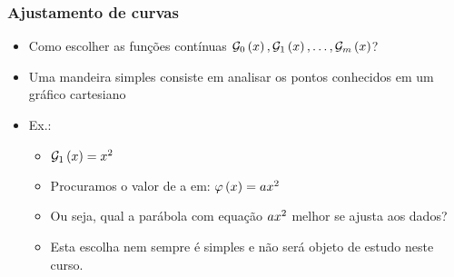 \begin{frame}
\frametitle{Ajustamento de curvas}

\begin{itemize}
  \item Como escolher as funções contínuas $\mathcal{G}_0\left(x\right), \mathcal{G}_1\left(x\right), \ldots, \mathcal{G}_m\left(x\right) $?
  \item Uma mandeira simples consiste em analisar os pontos conhecidos em um gráfico cartesiano
  \item Ex.:
    \begin{multicols}{2}
      \begin{itemize}
        \item $\mathcal{G}_1\left(x\right) = x^2$
        \item Procuramos o valor de a em: $\varphi \left(x\right) = ax^2$
        \item Ou seja, qual a parábola com equação $ax^2$ melhor se ajusta aos dados?
        \item<2-> Esta escolha nem sempre é simples e não será objeto de estudo neste curso. 
      \end{itemize}    
      \columnbreak
    \end{multicols}
\end{itemize}

\end{frame}

